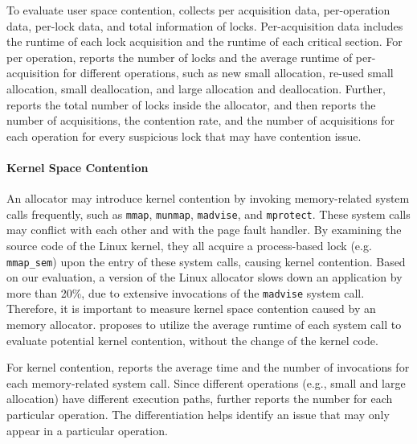 
To evaluate user space contention, \MP{} collects per acquisition data, per-operation data, per-lock data, and total information of locks. Per-acquisition data includes the runtime of each lock acquisition and the runtime of each critical section. For per operation, \MP{} reports the number of locks and the average runtime of per-acquisition for different operations, such as new small allocation, re-used small allocation, small deallocation, and large allocation and deallocation.  Further, \MP{} reports the total number of locks inside the allocator, and then reports the number of acquisitions, the contention rate, and the number of acquisitions for each operation for every suspicious lock that may have contention issue. 
 
\paragraph{Kernel Space Contention} 
 An allocator may introduce kernel contention by invoking memory-related system calls frequently, such as \texttt{mmap}, \texttt{munmap}, \texttt{madvise}, and \texttt{mprotect}. These system calls may conflict with each other and with the page fault handler. By examining the source code of the Linux kernel, they all acquire a process-based lock (e.g. \texttt{mmap\_sem}) upon the entry of these system calls, causing kernel contention. Based on our evaluation, a version of the Linux allocator slows down an application by more than 20\%, due to extensive invocations of the \texttt{madvise} system call. Therefore, it is important to measure  kernel space contention caused by an memory allocator. \MP{} proposes to utilize the average runtime of each system call to evaluate potential kernel contention, without the change of the kernel code.

For kernel contention, \MP{} reports the average time and the number of invocations for each memory-related system call. Since different operations (e.g., small and large allocation) have different execution paths, \MP{} further reports the number for each particular operation. The differentiation helps identify an issue that may only appear in a particular operation. 

